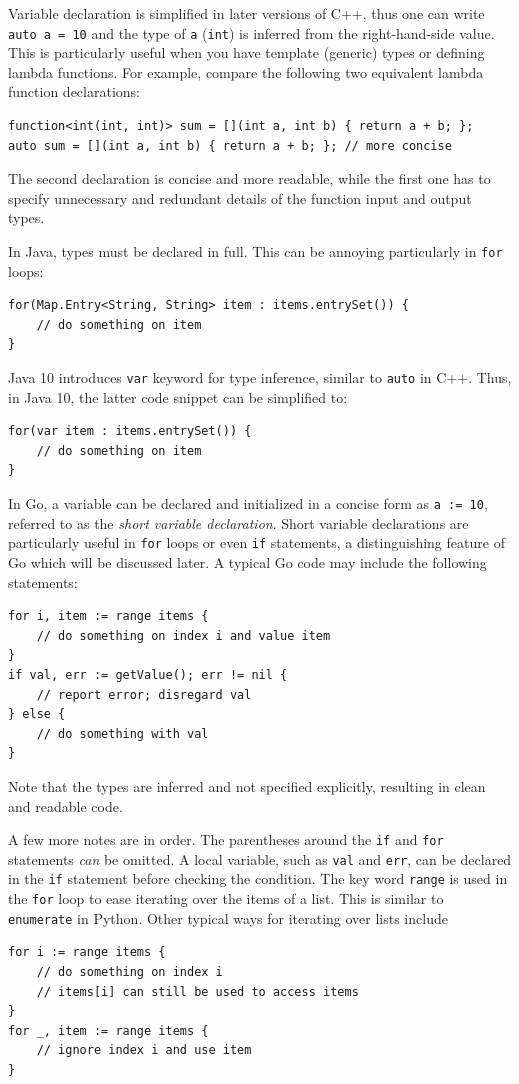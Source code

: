 \documentclass[11pt]{article}
\begin{document}
Variable declaration is simplified in later versions of C++, thus one can write \texttt{auto a = 10} and the type of \texttt{a} (\texttt{int}) is inferred from the right-hand-side value. This is particularly useful when you have template (generic) types or defining lambda functions. For example, compare the following two equivalent lambda function declarations:
\begin{verbatim}
function<int(int, int)> sum = [](int a, int b) { return a + b; };
auto sum = [](int a, int b) { return a + b; }; // more concise
\end{verbatim}
The second declaration is concise and more readable, while the first one has to specify unnecessary and redundant details of the function input and output types.

In Java, types must be declared in full. This can be annoying particularly in \texttt{for} loops:
\begin{verbatim}
for(Map.Entry<String, String> item : items.entrySet()) {
	// do something on item
}
\end{verbatim}
Java 10 introduces \texttt{var} keyword for type inference, similar to \texttt{auto} in C++. Thus, in Java 10, the latter code snippet can be simplified to:
\begin{verbatim}
for(var item : items.entrySet()) {
	// do something on item
}
\end{verbatim}

In Go, a variable can be declared and initialized in a concise form as \texttt{a := 10}, referred to as the \emph{short variable declaration}. Short variable declarations are particularly useful in \texttt{for} loops or even \texttt{if} statements, a distinguishing feature of Go which will be discussed later. A typical Go code may include the following statements:
\begin{verbatim}
for i, item := range items {
	// do something on index i and value item
}
if val, err := getValue(); err != nil {
	// report error; disregard val
} else {
	// do something with val
}
\end{verbatim}
Note that the types are inferred and not specified explicitly, resulting in clean and readable code.

A few more notes are in order. The parentheses around the \texttt{if} and \texttt{for} statements \emph{can} be omitted. A local variable, such as \texttt{val} and \texttt{err}, can be declared in the \texttt{if} statement before checking the condition. The key word \texttt{range} is used in the \texttt{for} loop to ease iterating over the items of a list. This is similar to \texttt{enumerate} in Python. Other typical ways for iterating over lists include
\begin{verbatim}
for i := range items {
	// do something on index i
	// items[i] can still be used to access items
}
for _, item := range items {
	// ignore index i and use item
}
\end{verbatim}
\end{document}
